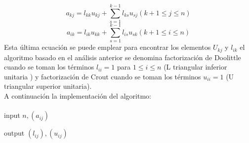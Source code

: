 \[a_{kj} = l_{kk} u_{kj} + \sum_{s=1}^{k-1} l_{ks} u_{sj}  (k+1 \leq j \leq n)\]  
\[a_{ik} = l_{ik} u_{kk} + \sum_{s=1}^{k-1} l_{is} u_{sk}  (k+1 \leq i \leq n)\]  
Esta última ecuación se puede emplear para encontrar los elementos $U_{kj}$ y $l_{ik}$
el algoritmo basado en el análisis anterior se denomina factorización de Doolittle cuando se toman los términos $l_{ii}=1$ para $1\leq i \leq n$ (L triangular inferior unitaria ) y factorización de Crout cuando se toman los términos $u_{ii} = 1$ (U triangular superior unitaria).\\
A continuación la implementación del algoritmo:\\\\
input $n,(a_{ij})$
\begin{algorithmic}	
		\EndFor
	\EndFor
	\State output{ $(l_{ij}),(u_{ij})$}
\end{algorithmic}